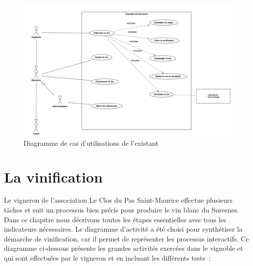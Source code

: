 \documentclass[a4paper, titlepage]{report}
\begin{document}
\begin{figure}[!h]
\centering
\includegraphics{Images/UseCaseDiagramExistant.jpg}
\caption{Diagramme de cas d'utilisations de l'existant}
\end{figure}

\section{La vinification}

Le vigneron de l'association Le Clos du Pas Saint-Maurice effectue
plusieurs tâches et suit un processus bien précis pour produire le vin
blanc du Suresnes. Dans ce chapitre nous décrivons toutes les étapes
essentielles avec tous les indicateurs nécessaires. Le diagramme
d'activité a été choisi pour synthétiser la démarche de vinification,
car il permet de représenter les processus interactifs. Ce diagramme
ci-dessous présente les grandes activités exercées dans le vignoble et
qui sont effectuées par le vigneron et en incluant les différents
tests~:
\end{document}
